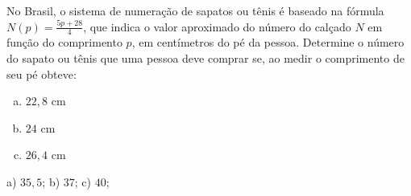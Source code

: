   \begin{exer}
  No Brasil, o sistema de numeração de sapatos ou tênis é baseado na fórmula $N(p)= \frac{5p + 28}{4}$, que indica o valor aproximado do número do calçado $N$ em função do comprimento $p$, em centímetros do pé da pessoa. Determine o número do sapato ou tênis que uma pessoa deve comprar se, ao medir o comprimento de seu pé obteve:
  \begin{enumerate}[a)]
  \item $22,8$ cm
  \item $24$ cm
  \item $26,4$ cm
  \end{enumerate}
  \end{exer}
  \begin{resp}
    a) $35,5$; b) $37$; c) $40$;
  \end{resp}
